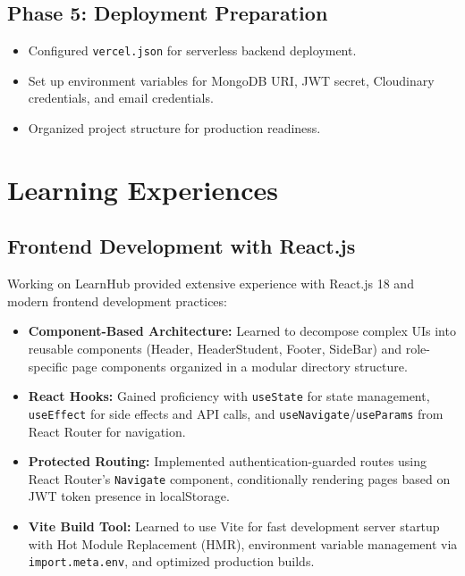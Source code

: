 \documentclass[12pt,a4paper]{report}
\begin{document}
\section{Phase 5: Deployment Preparation}
\begin{itemize}
    \item Configured \texttt{vercel.json} for serverless backend deployment.
    \item Set up environment variables for MongoDB URI, JWT secret, Cloudinary credentials, and email credentials.
    \item Organized project structure for production readiness.
\end{itemize}




\chapter{Learning Experiences}

\section{Frontend Development with React.js}
Working on LearnHub provided extensive experience with React.js 18 and modern frontend development practices:
\begin{itemize}
    \item \textbf{Component-Based Architecture:} Learned to decompose complex UIs into reusable components (Header, HeaderStudent, Footer, SideBar) and role-specific page components organized in a modular directory structure.
    \item \textbf{React Hooks:} Gained proficiency with \texttt{useState} for state management, \texttt{useEffect} for side effects and API calls, and \texttt{useNavigate}/\texttt{useParams} from React Router for navigation.
    \item \textbf{Protected Routing:} Implemented authentication-guarded routes using React Router's \texttt{Navigate} component, conditionally rendering pages based on JWT token presence in localStorage.
    \item \textbf{Vite Build Tool:} Learned to use Vite for fast development server startup with Hot Module Replacement (HMR), environment variable management via \texttt{import.meta.env}, and optimized production builds.
\end{itemize}
\end{document}
